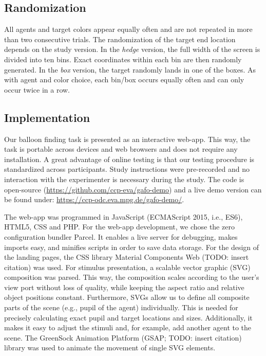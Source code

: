 \documentclass[
  english,
  man,floatsintext]{apa6}
\begin{document}
\hypertarget{randomization}{%
\subsection{Randomization}\label{randomization}}

All agents and target colors appear equally often and are not repeated in more than two consecutive trials. The randomization of the target end location depends on the study version. In the \emph{hedge} version, the full width of the screen is divided into ten bins. Exact coordinates within each bin are then randomly generated. In the \emph{box} version, the target randomly lands in one of the boxes. As with agent and color choice, each bin/box occurs equally often and can only occur twice in a row.

\hypertarget{implementation}{%
\subsection{Implementation}\label{implementation}}

Our balloon finding task is presented as an interactive web-app. This way, the task is portable across devices and web browsers and does not require any installation. A great advantage of online testing is that our testing procedure is standardized across participants. Study instructions were pre-recorded and no interaction with the experimenter is necessary during the study. The code is open-source (\url{https://github.com/ccp-eva/gafo-demo}) and a live demo version can be found under: \url{https://ccp-odc.eva.mpg.de/gafo-demo/}.

The web-app was programmed in JavaScript (ECMAScript 2015, i.e., ES6), HTML5, CSS and PHP.
For the web-app development, we chose the zero configuration bundler Parcel. It enables a live server for debugging, makes imports easy, and minifies scripts in order to save data storage.
For the design of the landing pages, the CSS library Material Components Web (TODO: insert citation) was used.
For stimulus presentation, a scalable vector graphic (SVG) composition was parsed. This way, the composition scales according to the user's view port without loss of quality, while keeping the aspect ratio and relative object positions constant.
Furthermore, SVGs allow us to define all composite parts of the scene (e.g., pupil of the agent) individually. This is needed for precisely calculating exact pupil and target locations and sizes. Additionally, it makes it easy to adjust the stimuli and, for example, add another agent to the scene.
The GreenSock Animation Platform (GSAP; TODO: insert citation) library was used to animate the movement of single SVG elements.
\end{document}
